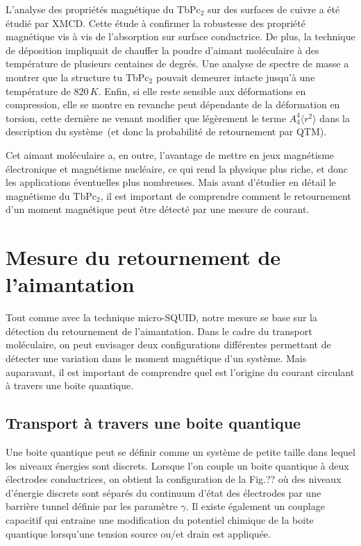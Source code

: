 L'analyse des propriétés magnétique du TbPc$_{2}$ sur des surfaces de cuivre a été étudié par XMCD. Cette étude à confirmer la robustesse des propriété magnétique vis à vis de l’absorption sur surface conductrice. De plus, la technique de déposition impliquait de chauffer la poudre d'aimant moléculaire à des température de plusieurs centaines de degrés. Une analyse de spectre de masse a montrer que la structure tu TbPc$_{2}$ pouvait demeurer intacte jusqu'à une température de $820\,K$. Enfin, si elle reste sensible aux déformations en compression, elle se montre en revanche peut dépendante de la déformation en torsion, cette dernière ne venant modifier que légèrement le terme $A_4^4 \langle r^2 \rangle$ dans la description du système~(et donc la probabilité de retournement par QTM).

Cet aimant moléculaire a, en outre, l'avantage de mettre en jeux magnétisme électronique et magnétisme nucléaire, ce qui rend la physique plus riche, et donc les applications éventuelles plus nombreuses. Mais avant d'étudier en détail le magnétisme du TbPc$_{2}$, il est important de comprendre comment le retournement d'un moment magnétique peut être détecté par une mesure de courant.


\section{Mesure du retournement \newline de l'aimantation}
Tout comme avec la technique micro-SQUID, notre mesure se base sur la détection du retournement de l'aimantation. Dans le cadre du transport moléculaire, on peut envisager deux configurations différentes permettant de détecter une variation dans le moment magnétique d'un système. Mais auparavant, il est important de comprendre quel est l'origine du courant circulant à travers une boite quantique.

\subsection{Transport à travers une boite quantique}
Une boite quantique peut se définir comme un système de petite taille dans lequel les niveaux énergies sont discrets. Lorsque l'on couple un boite quantique à deux électrodes conductrices, on obtient la configuration de la Fig.?? où des niveaux d'énergie discrets sont séparés du continuum d'état des électrodes par une barrière tunnel définie par les paramètre $\gamma$. Il existe également un couplage capacitif qui entraine une modification du potentiel chimique de la boite quantique lorsqu'une tension source ou/et drain est appliquée.

